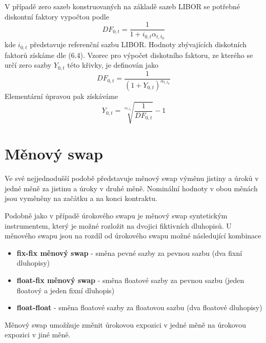 \documentclass[a4paper]{book}
\begin{document}
V případě zero sazeb konstruovaných na základě sazeb LIBOR se potřebné diskontní faktory vypočtou podle
\begin{equation*}
DF_{0,t} = \frac{1}{1 + i_{0,t}\alpha_{t, t_0}}
\end{equation*}
kde $i_{0,t}$ představuje referenční sazbu LIBOR. Hodnoty zbývajících diskotních faktorů získáme dle (6.4). Vzorec pro výpočet diskotního faktoru, ze kterého se určí zero sazby $Y_{0,t}$ této křivky, je definován jako
\begin{equation*}
DF_{0,t} = \frac{1}{(1 + Y_{0,t})^{\alpha_{t, t_0}}}
\end{equation*}
Elementární úpravou pak získáváme
\begin{equation*}
Y_{0,t} = \sqrt[\alpha_{t, t_0}]{\frac{1}{DF_{0,t}}} - 1
\end{equation*}

\section {Měnový swap}

Ve své nejjednodušší podobě představuje měnový swap výměnu jistiny a úroků v jedné měně za jistinu a úroky v druhé měně. Nominální hodnoty v obou měnách jsou vyměněny na začátku a na konci kontraktu.

Podobně jako v případě úrokového swapu je měnový swap syntetickým instrumentem, který je možné rozložit na dvojici fiktivních dluhopisů. U měnového swapu jsou na rozdíl od úrokového swapu možné následující kombinace
\begin{itemize}
\item \textbf{fix-fix měnový swap} - směna pevné sazby za pevnou sazbu (dva fixní dluhopisy)
\item \textbf{float-fix měnový swap} - směna floatové sazby za pevnou sazbu (jeden floatový a jeden fixní dluhopis)
\item \textbf{float-float} - směna floatové sazby za floatovou sazbu (dva floatové dluhopisy)
\end{itemize}
Měnový swap umožňuje změnit úrokovou expozici v jedné měně na úrokovou expozici v jiné měně.\\
\end{document}
